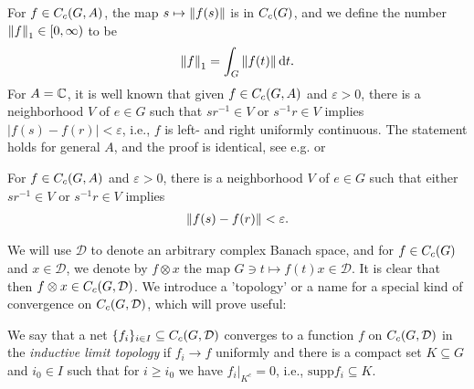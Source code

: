 For $f \in C_c(G,A)$, the map $s \mapsto \left\lVert f(s) \right\rVert$ is in $C_c(G)$, and we define the number $\left\lVert f \right\rVert_1 \in [0,\infty)$ to be
\begin{align*}
	\left\lVert f \right\rVert_1 = \int_G \left\lVert f(t) \right\rVert \mathrm{d} t.
\end{align*}
For $A= \mathbb{C}$, it is well known that given $f \in C_c(G,A)$ and $\varepsilon > 0$, there is a neighborhood $V$ of $e \in G$ such that $sr^{-1} \in V$ or $s^{-1}r \in V$ implies $| f(s) - f(r)| < \varepsilon$, i.e., $f$ is left- and right uniformly continuous. The statement holds for general $A$, and the proof is identical, see e.g. \cite[Proposition 2.6]{folland2016fourier} or \cite[Lemma 1.88]{williamscrossed}
\begin{lemma}
	For $f \in C_c(G,A)$ and $\varepsilon>0$, there is a neighborhood $V$ of $e \in G$ such that either $sr^{-1} \in V$ or $s^{-1}r \in V$ implies
	\begin{align*}
		\left\lVert f(s)  - f(r) \right\rVert < \varepsilon.
	\end{align*}
	\label{cross:lrunicont}
\end{lemma}

We will use $\mathcal{D}$ to denote an arbitrary complex Banach space, and for $f \in C_c(G)$ and $x \in \mathcal{D}$, we denote by $f \otimes x$ the map $G \ni t \mapsto f(t)x \in \mathcal{D}$. It is clear that then $f \otimes x \in C_c(G,\mathcal{D})$. We introduce a 'topology' or a name for a special kind of convergence on $C_c(G,\mathcal{D})$, which will prove useful:
\begin{definition}
	We say that a net $\{f_i\}_{i \in I} \subseteq C_c(G,\mathcal{D})$ converges to a function $f$ on $C_c(G,\mathcal{D})$ in the \emph{inductive limit topology} if $f_i \to f$ uniformly and there is a compact set $K \subseteq G$ and $i_0 \in I$ such that for $i \geq i_0$ we have $f_i \big|_{K^c} = 0$, i.e., $\mathrm{supp} f_i \subseteq K$.
\end{definition}

